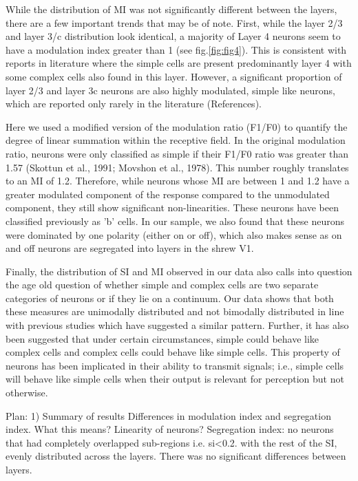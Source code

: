 	While the distribution of MI was not significantly different between the layers, there are a few important trends that may be of note. First, while the layer 2/3 and layer 3/c distribution look identical, a majority of Layer 4 neurons seem to have a modulation index greater than 1 (see fig.\ref{fig:fig4}). This is consistent with reports in literature where the simple cells are present predominantly layer 4 with some complex cells also found in this layer. However, a significant proportion of layer 2/3 and layer 3c neurons are also highly modulated, simple like neurons, which are reported only rarely in the literature (References). 
	
	Here we used a modified version of the modulation ratio (F1/F0) to quantify the degree of linear summation within the receptive field. In the original modulation ratio, neurons were only classified as simple if their F1/F0 ratio was greater than 1.57 (Skottun et al., 1991; Movshon et al., 1978). This number roughly translates to an MI of 1.2. Therefore, while neurons whose MI are between 1 and 1.2 have a greater modulated component of the response compared to the unmodulated component, they still show significant non-linearities. These neurons have been classified previously as 'b' cells. In our sample, we also found that these neurons were dominated by one polarity (either on or off), which also makes sense as on and off neurons are segregated into layers in the shrew V1.

	Finally, the distribution of SI and MI observed in our data also calls into question the age old question of whether simple and complex cells are two separate categories of neurons or if they lie on a continuum. Our data shows that both these measures are unimodally distributed and not bimodally distributed in line with previous studies which have suggested a similar pattern. Further, it has also been suggested that under certain circumstances, simple could behave like complex cells and complex cells could behave like simple cells. This property of neurons has been implicated in their ability to transmit signals; i.e., simple cells will behave like simple cells when their output is relevant for perception but not otherwise.

	Plan:
	1) Summary of results
		Differences in modulation index and segregation index. What this means? Linearity of neurons?
		Segregation index: no neurons that had completely overlapped sub-regions i.e. si<0.2.
		with the rest of the SI, evenly distributed across the layers.
		There was no significant differences between layers.

